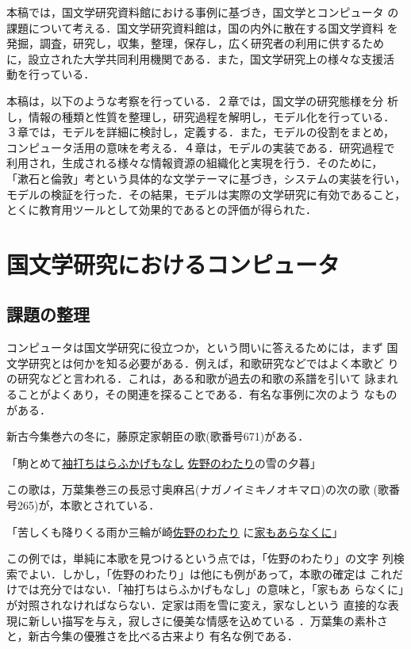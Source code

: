 本稿では，国文学研究資料館における事例に基づき，国文学とコンピュータ
の課題について考える．国文学研究資料館は，国の内外に散在する国文学資料
を発掘，調査，研究し，収集，整理，保存し，広く研究者の利用に供するため
に，設立された大学共同利用機関である．また，国文学研究上の様々な支援活
動を行っている\cite{Kokubun1982}．

本稿は，以下のような考察を行っている．２章では，国文学の研究態様を分
析し，情報の種類と性質を整理し，研究過程を解明し，モデル化を行っている．
３章では，モデルを詳細に検討し，定義する．また，モデルの役割をまとめ，
コンピュータ活用の意味を考える．４章は，モデルの実装である．研究過程で
利用され，生成される様々な情報資源の組織化と実現を行う．そのために，
「漱石と倫敦」考という具体的な文学テーマに基づき，システムの実装を行い，
モデルの検証を行った．その結果，モデルは実際の文学研究に有効であること，
とくに教育用ツールとして効果的であるとの評価が得られた．

\section{国文学研究におけるコンピュータ}

\subsection{課題の整理}
コンピュータは国文学研究に役立つか，という問いに答えるためには，まず
国文学研究とは何かを知る必要がある．例えば，和歌研究などではよく本歌ど
り\footnotemark {}の研究などと言われる．これは，ある和歌が過去の和歌の系譜を引いて
詠まれることがよくあり，その関連を探ることである．有名な事例に次のよう
なものがある．

新古今集巻六の冬に，藤原定家朝臣の歌(歌番号671)がある．

\vspace{1em}
「駒とめて\underline{袖打ちはらふかげもなし}
\underline{\underline{佐野のわたり}}の雪の夕暮」

\vspace{1em}
この歌は，万葉集巻三の長忌寸奥麻呂(ナガノイミキノオキマロ)の次の歌
(歌番号265)が，本歌とされている．

\vspace{1em}
「苦しくも降りくる雨か三輪が崎\underline{\underline{佐野のわたり}}
に\underline{家もあらなくに}」

\vspace{1em}
この例では，単純に本歌を見つけるという点では，「佐野のわたり」の文字
列検索でよい．しかし，「佐野のわたり」は他にも例があって，本歌の確定は
これだけでは充分ではない．「袖打ちはらふかげもなし」の意味と，「家もあ
らなくに」が対照されなければならない．定家は雨を雪に変え，家なしという
直接的な表現に新しい描写を与え，寂しさに優美な情感を込めている
\cite{Tanaka1992}．万葉集の素朴さと，新古今集の優雅さを比べる古来より
有名な例である．

